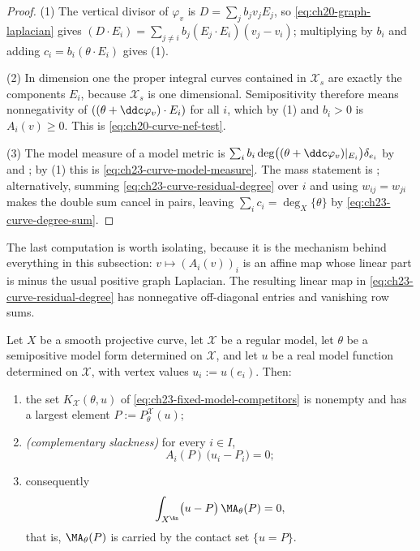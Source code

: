 \begin{proof}
(1) The vertical divisor of $\varphi_v$ is $D=\sum_jb_jv_jE_j$, so
\eqref{eq:ch20-graph-laplacian} gives
$(D\cdot E_i)=\sum_{j\ne i}b_j(E_j\cdot E_i)(v_j-v_i)$; multiplying by
$b_i$ and adding $c_i=b_i(\theta\cdot E_i)$ gives (1).

(2) In dimension one the proper integral curves contained in
$\mathcal X_s$ are exactly the components $E_i$, because
$\mathcal X_s$ is one dimensional.  Semipositivity therefore means
nonnegativity of $((\theta+\ddc\varphi_v)\cdot E_i)$ for all $i$, which
by (1) and $b_i>0$ is $A_i(v)\geq0$.  This is
\eqref{eq:ch20-curve-nef-test}.

(3) The model measure of a model metric is
$\sum_ib_i\deg\bigl((\theta+\ddc\varphi_v)|_{E_i}\bigr)\delta_{e_i}$ by
 and ; by (1) this is
\eqref{eq:ch23-curve-model-measure}.  The mass statement is
; alternatively, summing
\eqref{eq:ch23-curve-residual-degree} over $i$ and using
$w_{ij}=w_{ji}$ makes the double sum cancel in pairs, leaving
$\sum_ic_i=\deg_X\{\theta\}$ by \eqref{eq:ch23-curve-degree-sum}.
\end{proof}

The last computation is worth isolating, because it is the mechanism behind
everything in this subsection: $v\mapsto(A_i(v))_i$ is an affine map whose
linear part is minus the usual positive graph Laplacian.  The resulting linear map in
\eqref{eq:ch23-curve-residual-degree} has nonnegative off-diagonal
entries and vanishing row sums.

\begin{theorem}
\label{thm:ch23-model-orthogonality-curve}
Let $X$ be a smooth projective curve, let $\mathcal X$ be a regular
model, let $\theta$ be a semipositive model form determined on
$\mathcal X$, and let $u$ be a real model function determined on
$\mathcal X$, with vertex values $u_i:=u(e_i)$.  Then:
\begin{enumerate}
\item the set $K_{\mathcal X}(\theta,u)$ of
\eqref{eq:ch23-fixed-model-competitors} is nonempty and has a largest
element $P:=P^{\mathcal X}_\theta(u)$;
\item \emph{(complementary slackness)} for every $i\in I$,
\begin{equation}\label{eq:ch23-complementary-slackness}
 A_i(P)\,\bigl(u_i-P_i\bigr)=0 ;
\end{equation}
\item consequently
\begin{equation}\label{eq:ch23-model-orthogonality}
 \int_{X^{\An}}\bigl(u-P\bigr)\,\MA_\theta(P)=0,
\end{equation}
that is, $\MA_\theta(P)$ is carried by the contact set
$\{u=P\}$.
\end{enumerate}
\end{theorem}

